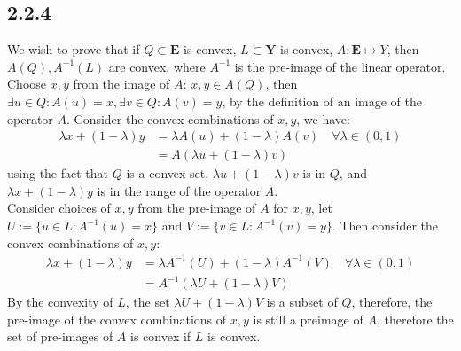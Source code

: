 \documentclass[]{article}
\begin{document}
    \subsection*{2.2.4}
        We wish to prove that if $Q \subset \mathbf{E}$ is convex, $L \subset \mathbf{Y}$ is convex, $A:\mathbf{E}\mapsto Y$, then $A(Q), A^{-1}(L)$ are convex, where $A^{-1}$ is the pre-image of the linear operator. 
        \\[1.1em]
        Choose $x, y$ from the image of $A$: $x, y \in A(Q)$, then $\exists u \in Q: A(u) = x, \exists v \in Q: A(v) = y$, by the definition of an image of the operator $A$. Consider the convex combinations of $x, y$, we have: 
        \begin{align*}\tag{2.2.4.1}\label{eqn:2.2.4.1}
            \lambda x + (1 - \lambda) y &= \lambda A(u) + (1 - \lambda) A(v) \quad \forall \lambda \in (0, 1)
            \\
            &= A(\lambda u + (1 - \lambda) v)
        \end{align*}
        using the fact that $Q$ is a convex set, $\lambda u + (1 - \lambda)v$ is in $Q$, and $\lambda x + (1 - \lambda) y$ is in the range of the operator $A$. 
        \\[1.1em]
        Consider choices of $x, y$ from the pre-image of $A$ for $x, y$, let $U := \{u\in L: A^{-1}(u) = x\}$ and $V := \{v\in L: A^{-1}(v) = y\}$. Then consider the convex combinations of $x, y$: 
        \begin{align*}\tag{2.2.4.2}\label{eqn:2.2.4.2}
            \lambda x + (1- \lambda)y &= \lambda A^{-1}(U) + (1- \lambda)A^{-1}(V) \quad \forall \lambda \in (0, 1)
            \\
            &= A^{-1}(\lambda U + (1- \lambda)V)
        \end{align*}
        By the convexity of $L$, the set $\lambda U + (1 - \lambda)V$ is a subset of $Q$, therefore, the pre-image of the convex combinations of $x, y$ is still a preimage of $A$, therefore the set of pre-images of $A$ is convex if $L$ is convex. 
\end{document}

